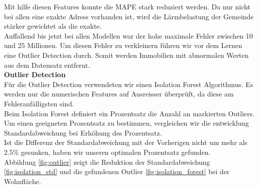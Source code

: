 %
Mit hilfe diesen Features konnte die MAPE stark reduziert werden. Da nur nicht bei allen eine exakte Adress vorhanden ist, wird die Lärmbelastung der Gemeinde stärker gewichtet als die exakte.\\[2ex]
%
Auffallend bis jetzt bei allen Modellen war der hohe maximale Fehler zwischen 10 und 25 Millionen. Um diesen Fehler zu verkleinern führen wir vor dem Lernen eine Outlier Detection durch. Somit werden Immobilien mit abnormalen Werten aus dem Datensatz entfernt.\\[2ex]
%
\textbf{Outlier Detection}\\
Für die Outlier Detection verwendeten wir einen Isolation Forest Algorithmus. Es werden nur die numerischen Features auf Ausreisser überprüft, da diese am Fehleranfälligsten sind.\\[2ex]
%
Beim Isolation Forest definiert ein Prozentsatz die Anzahl an markierten Outliers. 
Um einen geeigneten Prozentsatz zu bestimmen, vergleichen wir die entwicklung Standardabweichung bei Erhöhung des Prozentsatz.\\
Ist die Differenz der Standardabweichung mit der Vorherigen nicht um mehr als 2.5\% gesunken, haben wir unseren optimalen Prozentsatz gefunden.\\
Abbildung \ref{fig:outlier} zeigt die Reduktion der Standardabweichung \ref{fig:isolation_std} und die gefundenen Outlier \ref{fig:isolation_forest} bei der Wohnfläche. 
%

